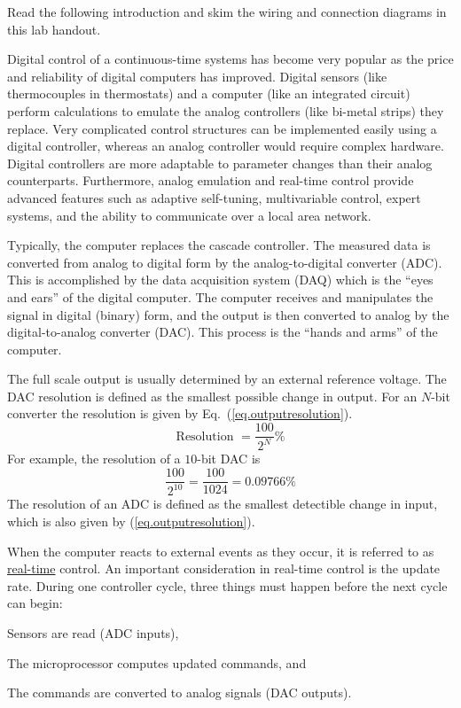 Read the following introduction and skim the wiring and connection diagrams in this lab handout.
\par
Digital control of a continuous-time systems has become very popular as the price and reliability of digital computers has improved.  Digital sensors (like thermocouples in thermostats) and a computer (like an integrated circuit)  perform calculations to emulate the analog controllers (like bi-metal strips) they replace.  Very complicated control structures can be implemented easily using a digital controller, whereas an analog controller would require complex hardware.  Digital controllers are more adaptable to parameter changes than their analog counterparts.  Furthermore, analog emulation and real-time control provide advanced features such as adaptive self-tuning, multivariable control, expert systems, and the ability to communicate over a local area network.
\par
Typically, the computer replaces the cascade controller.  The measured data is converted from analog to digital form by the analog-to-digital converter (ADC).  This is accomplished by the data acquisition system (DAQ) which is the ``eyes and ears'' of the digital computer.  The computer receives and manipulates the signal in digital (binary) form, and the output is then converted to analog by the digital-to-analog converter (DAC).  This process is the ``hands and arms'' of the computer.
\par
The full scale output is usually determined by an external reference voltage.  The DAC resolution is defined as the smallest possible change in output.  For an $N$-bit converter the resolution is given by Eq.\ (\ref{eq.outputresolution}).
\begin{equation}
    \mbox{Resolution } = \frac{100}{2^N}\%
    \label{eq.outputresolution}
\end{equation}
For example, the resolution of a $10$-bit DAC is
\begin{equation*}
    \frac{100}{2^{10}} = \frac{100}{1024} = 0.09766\%
\end{equation*}
The resolution of an ADC is defined as the smallest detectible change in input, which is also given by (\ref{eq.outputresolution}).
\par
When the computer reacts to external events as they occur, it is referred to as \uline{real-time} control.  An important consideration in real-time control is the update rate.  During one controller cycle, three things must happen before the next cycle can begin:
\begin{inparaenum}[1)]
\item
    Sensors are read (ADC inputs),
\item
    The microprocessor computes updated commands, and
\item
    The commands are converted to analog signals (DAC outputs).
\end{inparaenum}
